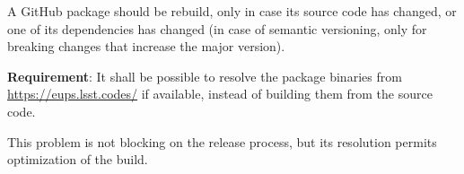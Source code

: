 A GitHub package should be rebuild, only in case its source code has changed, or one of its dependencies has changed (in case of semantic versioning, only for breaking changes that increase the major version).

\textbf{Requirement}: It shall be possible to resolve the package binaries from \url{https://eups.lsst.codes/} if available, instead of building them from the source code.

This problem is not blocking on the release process, but its resolution permits optimization of the build.


